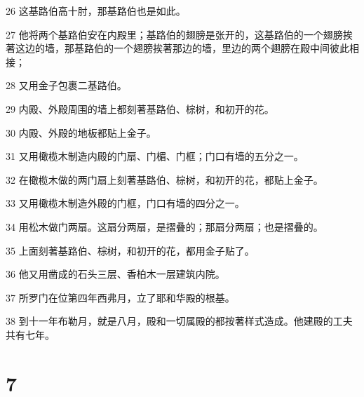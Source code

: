 \par 26 这基路伯高十肘，那基路伯也是如此。
\par 27 他将两个基路伯安在内殿里；基路伯的翅膀是张开的，这基路伯的一个翅膀挨著这边的墙，那基路伯的一个翅膀挨著那边的墙，里边的两个翅膀在殿中间彼此相接；
\par 28 又用金子包裹二基路伯。
\par 29 内殿、外殿周围的墙上都刻著基路伯、棕树，和初开的花。
\par 30 内殿、外殿的地板都贴上金子。
\par 31 又用橄榄木制造内殿的门扇、门楣、门框；门口有墙的五分之一。
\par 32 在橄榄木做的两门扇上刻著基路伯、棕树，和初开的花，都贴上金子。
\par 33 又用橄榄木制造外殿的门框，门口有墙的四分之一。
\par 34 用松木做门两扇。这扇分两扇，是摺叠的；那扇分两扇；也是摺叠的。
\par 35 上面刻著基路伯、棕树，和初开的花，都用金子贴了。
\par 36 他又用凿成的石头三层、香柏木一层建筑内院。
\par 37 所罗门在位第四年西弗月，立了耶和华殿的根基。
\par 38 到十一年布勒月，就是八月，殿和一切属殿的都按著样式造成。他建殿的工夫共有七年。

\chapter{7}

